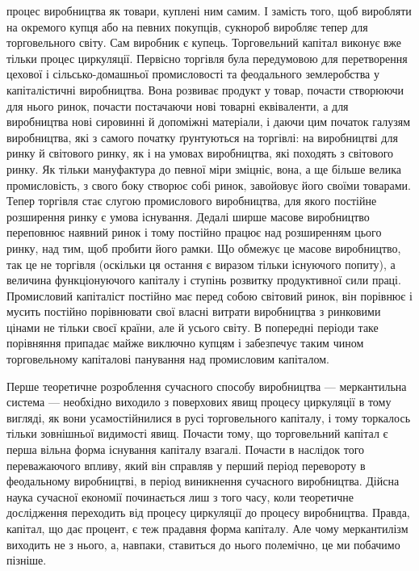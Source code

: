 \parcont{}  %
процес виробництва як товари, куплені ним самим. І замість
того, щоб виробляти на окремого купця або на певних покупців,
сукнороб виробляє тепер для торговельного світу. Сам виробник
є купець. Торговельний капітал виконує вже тільки
процес циркуляції. Первісно торгівля була передумовою для
перетворення цехової і сільсько-домашньої промисловості та феодального
землеробства у капіталістичні виробництва. Вона розвиває
продукт у товар, почасти створюючи для нього ринок,
почасти постачаючи нові товарні еквіваленти, а для виробництва
нові сировинні й допоміжні матеріали, і даючи цим початок
галузям виробництва, які з самого початку ґрунтуються
на торгівлі: на виробництві для ринку й світового ринку, як і на
умовах виробництва, які походять з світового ринку. Як тільки
мануфактура до певної міри зміцніє, вона, а ще більше велика
промисловість, з свого боку створює собі ринок, завойовує його
своїми товарами. Тепер торгівля стає слугою промислового
виробництва, для якого постійне розширення ринку є умова
існування. Дедалі ширше масове виробництво переповнює наявний
ринок і тому постійно працює над розширенням цього
ринку, над тим, щоб пробити його рамки. Що обмежує це
масове виробництво, так це не торгівля (оскільки ця остання є
виразом тільки існуючого попиту), а величина функціонуючого
капіталу і ступінь розвитку продуктивної сили праці. Промисловий
капіталіст постійно має перед собою світовий ринок, він
порівнює і мусить постійно порівнювати свої власні витрати виробництва
з ринковими цінами не тільки своєї країни, але й усього
світу. В попередні періоди таке порівняння припадає майже виключно
купцям і забезпечує таким чином торговельному капіталові
панування над промисловим капіталом.

Перше теоретичне розроблення сучасного способу виробництва
— меркантильна система — необхідно виходило з поверхових
явищ процесу циркуляції в тому вигляді, як вони усамостійнилися
в русі торговельного капіталу, і тому торкалось
тільки зовнішньої видимості явищ. Почасти тому, що торговельний
капітал є перша вільна форма існування капіталу взагалі.
Почасти в наслідок того переважаючого впливу, який він справляв
у перший період перевороту в феодальному виробництві,
в період виникнення сучасного виробництва. Дійсна наука сучасної
економії починається лиш з того часу, коли теоретичне дослідження
переходить від процесу циркуляції до процесу виробництва.
Правда, капітал, що дає процент, є теж прадавня форма
капіталу. Але чому меркантилізм виходить не з нього, а, навпаки,
ставиться до нього полемічно, це ми побачимо пізніше.

